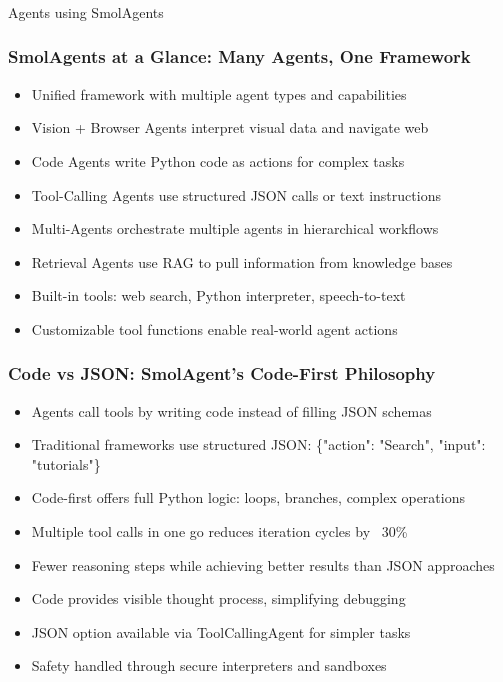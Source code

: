 \begin{frame}[fragile]\frametitle{}
\begin{center}
{\Large Agents using SmolAgents}
\end{center}
\end{frame}

\begin{frame}[fragile]\frametitle{SmolAgents at a Glance: Many Agents, One Framework}
      \begin{itemize}
	\item Unified framework with multiple agent types and capabilities
	\item Vision + Browser Agents interpret visual data and navigate web
	\item Code Agents write Python code as actions for complex tasks
	\item Tool-Calling Agents use structured JSON calls or text instructions
	\item Multi-Agents orchestrate multiple agents in hierarchical workflows
	\item Retrieval Agents use RAG to pull information from knowledge bases
	\item Built-in tools: web search, Python interpreter, speech-to-text
	\item Customizable tool functions enable real-world agent actions
	  \end{itemize}
\end{frame}

\begin{frame}[fragile]\frametitle{Code vs JSON: SmolAgent's Code-First Philosophy}
      \begin{itemize}
	\item Agents call tools by writing code instead of filling JSON schemas
	\item Traditional frameworks use structured JSON: \{"action": "Search", "input": "tutorials"\}
	\item Code-first offers full Python logic: loops, branches, complex operations
	\item Multiple tool calls in one go reduces iteration cycles by ~30\%
	\item Fewer reasoning steps while achieving better results than JSON approaches
	\item Code provides visible thought process, simplifying debugging
	\item JSON option available via ToolCallingAgent for simpler tasks
	\item Safety handled through secure interpreters and sandboxes
	  \end{itemize}
\end{frame}

